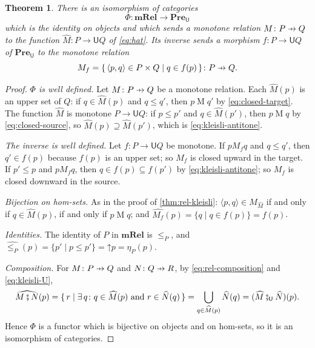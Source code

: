 \documentclass[11pt,a4paper]{article}
\theoremstyle{plain}
\newtheorem{theorem}{Theorem}[section]
\theoremstyle{definition}
\theoremstyle{remark}
\newcommand{\Cat}[1]{\mathbf{#1}}
\newcommand{\Pre}{\Cat{Pre}}
\newcommand{\mRel}{\Cat{mRel}}
\newcommand{\U}{\mathsf{U}}
\newcommand{\PreU}{\Pre_{\U}}
\newcommand{\then}{\mathbin{\fatsemi}}
\newcommand{\thenU}{\mathbin{\fatsemi_{\U}}}
\newcommand{\tup}[1]{\langle #1 \rangle}
\newcommand{\profto}{\mathrel{\ooalign{\hfil$\mapstochar\mkern 5mu$\hfil\cr$\to$\cr}}}
\newcommand{\rel}[3]{#1 \mathrel{#2} #3}
\newcommand{\up}{\mathord{\uparrow}}
\begin{document}
\begin{theorem}
    \label{thm:mrel-kleisli}
    There is an isomorphism of categories
    \begin{equation*}
        \Phi \colon \mRel \to \PreU
    \end{equation*}
    which is the identity on objects and which sends a monotone relation $M \colon P \profto Q$ to the function $\widehat{M} \colon P \to \U Q$ of \cref{eq:hat}.
    Its inverse sends a morphism $f \colon P \to \U Q$ of $\PreU$ to the monotone relation
    \begin{equation}
        \label{eq:phi-inverse}
        M_f = \{\, \tup{p,q} \in P \times Q \mid q \in f(p) \,\} \colon P \profto Q.
    \end{equation}
\end{theorem}
\begin{proof}
    \emph{$\Phi$ is well defined.}
    Let $M \colon P \profto Q$ be a monotone relation.
    Each $\widehat{M}(p)$ is an upper set of $Q$: if $q \in \widehat{M}(p)$ and $q \leq q'$, then $\rel{p}{M}{q'}$ by \cref{eq:closed-target}.
    The function $\widehat{M}$ is monotone $P \to \U Q$: if $p \leq p'$ and $q \in \widehat{M}(p')$, then $\rel{p}{M}{q}$ by \cref{eq:closed-source}, so $\widehat{M}(p) \supseteq \widehat{M}(p')$, which is \cref{eq:kleisli-antitone}.

    \emph{The inverse is well defined.}
    Let $f \colon P \to \U Q$ be monotone.
    If $\rel{p}{M_f}{q}$ and $q \leq q'$, then $q' \in f(p)$ because $f(p)$ is an upper set; so $M_f$ is closed upward in the target.
    If $p' \leq p$ and $\rel{p}{M_f}{q}$, then $q \in f(p) \subseteq f(p')$ by \cref{eq:kleisli-antitone}; so $M_f$ is closed downward in the source.

    \emph{Bijection on hom-sets.}
    As in the proof of \cref{thm:rel-kleisli}: $\tup{p,q} \in M_{\widehat{M}}$ if and only if $q \in \widehat{M}(p)$, if and only if $\rel{p}{M}{q}$; and $\widehat{M_f}(p) = \{ q \mid q \in f(p) \} = f(p)$.

    \emph{Identities.}
    The identity of $P$ in $\mRel$ is $\leq_P$, and $\widehat{\leq_P}(p) = \{ p' \mid p \leq p' \} = \up p = \eta_P(p)$.

    \emph{Composition.}
    For $M \colon P \profto Q$ and $N \colon Q \profto R$, by \cref{eq:rel-composition} and \cref{eq:kleisli-U},
    \begin{equation*}
        \widehat{M \then N}(p)
        = \{\, r \mid \exists\, q \colon q \in \widehat{M}(p) \text{ and } r \in \widehat{N}(q) \,\}
        = \bigcup_{q \in \widehat{M}(p)} \widehat{N}(q)
        = (\widehat{M} \thenU \widehat{N})(p).
    \end{equation*}
    Hence $\Phi$ is a functor which is bijective on objects and on hom-sets, so it is an isomorphism of categories.
\end{proof}
\end{document}
